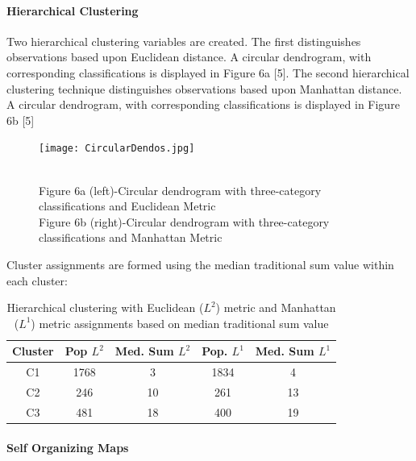 \documentclass[12pt,]{article}
\let\oldparagraph\paragraph
\renewcommand{\paragraph}[1]{\oldparagraph{#1}\mbox{}}
\begin{document}
\hypertarget{hierarchical-clustering}{%
\paragraph{Hierarchical Clustering}\label{hierarchical-clustering}}

Two hierarchical clustering variables are created. The first
distinguishes observations based upon Euclidean distance. A circular
dendrogram, with corresponding classifications is displayed in Figure 6a
{[}5{]}. The second hierarchical clustering technique distinguishes
observations based upon Manhattan distance. A circular dendrogram, with
corresponding classifications is displayed in Figure 6b {[}5{]}

\begin{figure}[!h]
\begin{center}
\texttt{[image: CircularDendos.jpg]}
\end{center}
\caption[Circular Dendrograms for Hierarchical Clustering]{ \\ Figure 6a (left)-Circular dendrogram with three-category classifications and Euclidean Metric \\ Figure 6b (right)-Circular dendrogram with three-category classifications and Manhattan Metric}
\end{figure}

\newpage

Cluster assignments are formed using the median traditional sum value
within each cluster:

\begin{table}[!h]
\begin{center}
\begin{tabular}{|c|c|c|c|c|}
\hline
Cluster &  Pop $L^{2}$ & Med. Sum  $L^{2}$ & Pop. $L^{1}$ & Med. Sum $L^{1}$\\
\hline
\hline
C1 & 1768 & 3 & 1834 & 4\\
\hline
C2 & 246 & 10 & 261 & 13 \\
\hline
C3 & 481 & 18 & 400 & 19 \\
\hline
\end{tabular}
\end{center}
\caption[Hierarchical Cluster assignments]{Hierarchical clustering with Euclidean ($L^{2}$) metric and Manhattan ($L^{1}$) metric assignments based on median traditional sum value}
\end{table}

\hypertarget{self-organizing-maps}{%
\paragraph{Self Organizing Maps}\label{self-organizing-maps}}
\end{document}
